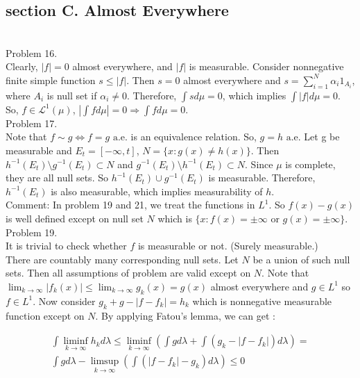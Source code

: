 \subsection*{section C. Almost Everywhere} \hfill \\

Problem 16. \\

Clearly, $ \lvert f \rvert = 0$ almost everywhere, and $\lvert f \rvert$ is measurable.
Consider nonnegative finite simple function $s \leq \lvert f \rvert$. Then $s=0$ almost everywhere
and $s = \sum_{i=1}^N \alpha_i 1_{A_i}$, where $A_i$ is null set if $\alpha_i \ne 0$.
Therefore, $\int s d\mu = 0$, which implies $\int \lvert f \rvert d\mu = 0$.
So, $f \in \mathcal{L}^1(\mu)$, $\left | \int f d \mu \right | =0 \Rightarrow \int f d \mu = 0$.\\

Problem 17. \\

Note that $f \sim g \Leftrightarrow f = g\text{ a.e.}$ is an equivalence relation.
So, $g = h \text{ a.e}$.
Let g be measurable and $E_t = \left [ -\infty, t \right]$, $N = \{ x : g(x) \ne h(x)\}$.
Then $h^{-1}(E_t) \setminus g^{-1}(E_t) \subset N$ and $g^{-1}(E_t) \setminus h^{-1}(E_t) \subset N$.
Since $\mu$ is complete, they are all null sets. So $h^{-1}(E_t) \cup g^{-1}(E_t)$ is measurable.
Therefore, $h^{-1}(E_t)$ is also measurable, which implies measurability of $h$.\\

Comment: In problem 19 and 21, we treat the functions in $L^1$. So $f(x) - g(x)$ is well defined except on null set $N$ which is $\{ x: f(x) = \pm \infty \text { or } g(x) = \pm \infty \} $. \\

Problem 19. \\

It is trivial to check whether $f$ is measurable or not. (Surely measurable.)\\
There are countably many corresponding null sets. Let $N$ be a union of such null sets.
Then all assumptions of problem are valid except on $N$.
Note that $\lim_{k\rightarrow \infty} \left| f_k\left( x \right) \right | \leq \lim_{k\rightarrow \infty} g_k \left( x \right) = g(x)$ almost everywhere  and $g \in L^1$ so $f \in L^1$.
Now consider $g_k + g - \left | f - f_k  \right | = h_k $ which is nonnegative measurable function except on $N$.
By applying Fatou's lemma, we can get :

\begin{multline*}
	\int \liminf_{k \rightarrow \infty } h_k d\lambda \leq \liminf_{k\rightarrow \infty } \left( \int g d\lambda + \int \left( g_k - \left | f - f_k  \right |  \right) d\lambda  \right) = \\
	\int g d\lambda - \limsup_{k\rightarrow \infty } \left( \int \left( \left| f - f_k  \right | - g_k \right) d\lambda  \right) \leq 0
\end{multline*}

